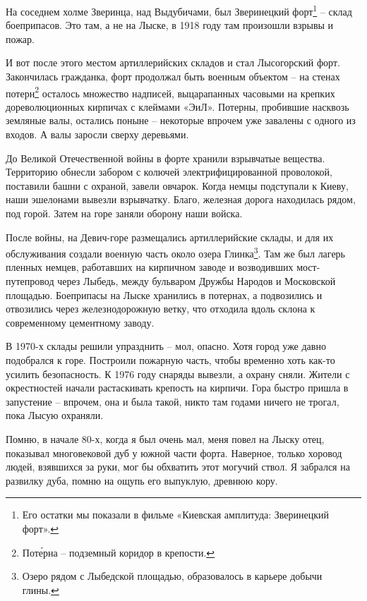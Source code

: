 На соседнем холме Зверинца, над Выдубичами, был Зверинецкий форт\footnote{Его остатки мы показали в фильме «Киевская амплитуда: Зверинецкий форт».} – склад боеприпасов. Это там, а не на Лыске, в 1918 году там произошли взрывы и пожар.

И вот после этого местом артиллерийских складов и стал Лысогорский форт. Закончилась гражданка, форт продолжал быть военным объектом – на стенах потерн\footnote{Пот\'ерна – подземный коридор в крепости.} осталось множество надписей, выцарапанных часовыми на крепких дореволюционных кирпичах с клеймами «ЭиЛ». Потерны, пробившие насквозь земляные валы, остались поныне – некоторые впрочем уже завалены с одного из входов. А валы заросли сверху деревьями.


До Великой Отечественной войны в форте хранили взрывчатые вещества. Территорию обнесли забором с колючей электрифицированной проволокой, поставили башни с охраной, завели овчарок. Когда немцы подступали к Киеву, наши эшелонами вывезли взрывчатку. Благо, железная дорога находилась рядом, под горой. Затем на горе заняли оборону наши войска.

После войны, на Девич-горе размещались артиллерийские склады, и для их обслуживания создали военную часть около озера Глинка\footnote{Озеро рядом с Лыбедской площадью, образовалось в карьере добычи глины.}. Там же был лагерь пленных немцев, работавших на кирпичном заводе и возводивших мост-путепровод через Лыбедь, между бульваром Дружбы Народов и Московской площадью. Боеприпасы на Лыске хранились в потернах, а подвозились и отвозились через железнодорожную ветку, что отходила вдоль склона к современному цементному заводу.

В 1970-х склады решили упразднить – мол, опасно. Хотя город уже давно подобрался к горе. Построили пожарную часть, чтобы временно хоть как-то усилить безопасность. К 1976 году снаряды вывезли, а охрану сняли. Жители с окрестностей начали растаскивать крепость на кирпичи. Гора быстро пришла в запустение – впрочем, она и была такой, никто там годами ничего не трогал, пока Лысую охраняли.

Помню, в начале 80-х, когда я был очень мал, меня повел на Лыску отец, показывал многовековой дуб у южной части форта. Наверное, только хоровод людей, взявшихся за руки, мог бы обхватить этот могучий ствол. Я забрался на развилку дуба, помню на ощупь его выпуклую, древнюю кору.

